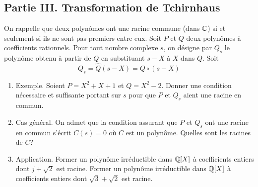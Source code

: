 \subsection*{Partie III. Transformation de Tchirnhaus}
On rappelle que deux polynômes ont une racine commune (dans $\mathbb{C}$) si et seulement si ils ne sont pas premiers entre eux.\newline
Soit $P$ et $Q$ deux polynômes à coefficients rationnels. Pour tout nombre complexe $s$, on désigne par $Q_s$ le polynôme obtenu à partir de $Q$ en substituant $s-X$ à $X$ dans $Q$. Soit 
\begin{displaymath}
Q_s=\widehat{Q}(s-X)=Q\circ (s-X) 
\end{displaymath}
\begin{enumerate}
\item  Exemple.\newline
Soient $P=X^2+X+1$ et $Q=X^2-2$. Donner une condition nécessaire et suffisante portant sur $s$ pour
que $P$ et $Q_s$ aient une racine en commun.
\item Cas général.\newline
On admet que la condition assurant que $P$ et $Q_s$ ont une racine en commun s'écrit $C(s)=0$ où $C$ est un polynôme. Quelles sont les racines de $C$?
\item Application.\newline
Former un polynôme irréductible dans $\mathbb{Q}[X]$ à coefficients entiers dont $j+\sqrt{2}$ est racine. Former un polynôme irréductible dans $\mathbb{Q}[X]$ à coefficients entiers dont $\sqrt{3}+\sqrt{2}$ est racine.
\end{enumerate}

